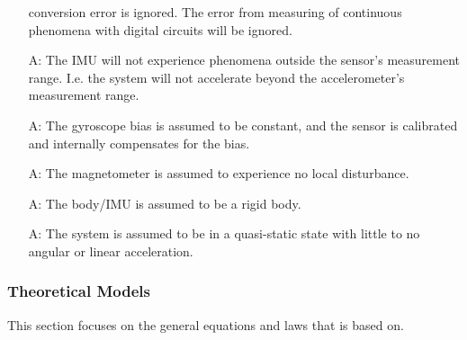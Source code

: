 \documentclass[12pt]{article}
\begin{document}
\begin{itemize}
    conversion error is ignored. The error from measuring of continuous phenomena with digital
    circuits will be ignored.
    \item[A\refstepcounter{assumpnum}\theassumpnum \label{a:range}:] The IMU will not experience
    phenomena outside the sensor's measurement range. I.e. the system will not accelerate beyond the
    accelerometer's measurement range.
    \item[A\refstepcounter{assumpnum}\theassumpnum \label{a:gyro}:] The gyroscope bias is assumed to
    be constant, and the sensor is calibrated and internally compensates for the bias. 
    \item[A\refstepcounter{assumpnum}\theassumpnum \label{a:mag}:] The magnetometer is assumed to
    experience no local disturbance.
    \item[A\refstepcounter{assumpnum}\theassumpnum \label{a:rigid}:] The body/IMU is assumed to be a
    rigid body.
    \item[A\refstepcounter{assumpnum}\theassumpnum \label{a:static}:] The system is assumed to be in
    a quasi-static state with little to no angular or linear acceleration.
\end{itemize}

\subsubsection{Theoretical Models}\label{sec_theoretical}



This section focuses on the general equations and laws that \progname{} is based on.  

\end{document}
